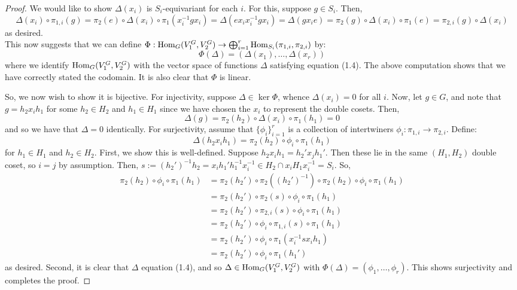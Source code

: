 \begin{proof}
	We would like to show $\Delta(x_i)$ is $S_i$-equivariant for each $i$. For this, suppose $g \in S_i$. Then,
	\[ \Delta(x_i) \circ \pi_{1,i}(g) = \pi_2(e) \circ \Delta(x_i) \circ \pi_1(x_i^{-1}gx_i) = \Delta(ex_ix_i^{-1}gx_i) = \Delta(gx_ie) = \pi_2(g) \circ \Delta(x_i) \circ \pi_1(e) = \pi_{2,i}(g) \circ \Delta(x_i) \]
	as desired. \\
	
	This now suggests that we can define $\Phi : \operatorname{Hom}_G(V_1^G,V_2^G) \to \bigoplus_{i=1}^r \operatorname{Hom}_{S_i}(\pi_{1,i},\pi_{2,i})$ by:
	\[ \Phi(\Delta) = (\Delta(x_1),\ldots,\Delta(x_r)) \]
	where we identify $\operatorname{Hom}_G(V_1^G,V_2^G)$ with the vector space of functions $\Delta$ satisfying equation (1.4). The above computation shows that we have correctly stated the codomain. It is also clear that $\Phi$ is linear.
	
	So, we now wish to show it is bijective. For injectivity, suppose $\Delta \in \ker\Phi$, whence $\Delta(x_i) = 0$ for all $i$. Now, let $g \in G$, and note that $g = h_2x_ih_1$ for some $h_2 \in H_2$ and $h_1 \in H_1$ since we have chosen the $x_i$ to represent the double cosets. Then,
	\[ \Delta(g) = \pi_2(h_2) \circ \Delta(x_i) \circ \pi_1(h_1) = 0 \]
	and so we have that $\Delta = 0$ identically. For surjectivity, assume that $\{\phi_i\}_{i=1}^r$ is a collection of intertwiners $\phi_i : \pi_{1,i} \to \pi_{2,i}$. Define:
	\[ \Delta(h_2x_ih_1) = \pi_2(h_2) \circ \phi_i \circ \pi_1(h_1) \]
	for $h_1 \in H_1$ and $h_2 \in H_2$. First, we show this is well-defined. Suppose $h_2x_ih_1 = h_2'x_jh_1'$. Then these lie in the same $(H_1,H_2)$ double coset, so $i=j$ by assumption. Then, $s := (h_2')^{-1}h_2 = x_ih_1'h_1^{-1}x_i^{-1} \in H_2 \cap x_iH_1x_i^{-1} = S_i$. So,
	\begin{align*}
	\pi_2(h_2) \circ \phi_i \circ \pi_1(h_1)
		&= \pi_2(h_2') \circ \pi_2((h_2')^{-1}) \circ \pi_2(h_2) \circ \phi_i \circ \pi_1(h_1) \\
		&= \pi_2(h_2') \circ \pi_2(s) \circ \phi_i \circ \pi_1(h_1) \\
		&= \pi_2(h_2') \circ \pi_{2,i}(s) \circ \phi_i \circ \pi_1(h_1) \\
		&= \pi_2(h_2') \circ \phi_i \circ \pi_{1,i}(s) \circ \pi_1(h_1) \\
		&= \pi_2(h_2') \circ \phi_i \circ \pi_1(x_i^{-1}sx_ih_1) \\
		&= \pi_2(h_2') \circ \phi_i \circ \pi_1(h_1')
	\end{align*}
	as desired. Second, it is clear that $\Delta$ equation (1.4), and so $\Delta \in \operatorname{Hom}_G(V_1^G,V_2^G)$ with $\Phi(\Delta) = (\phi_1,\ldots,\phi_r)$. This shows surjectivity and completes the proof.
\end{proof}
